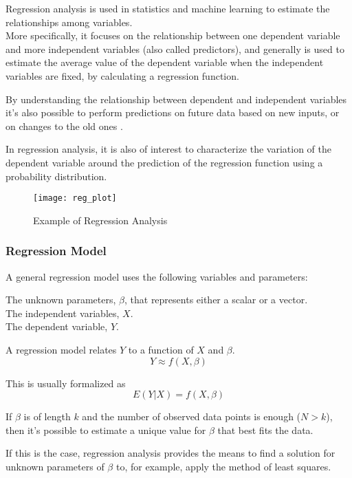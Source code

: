 Regression analysis is used in statistics and machine learning to estimate the relationships among variables. \\
More specifically, it focuses on the relationship between one dependent variable and more independent variables (also called predictors), and generally is used to estimate the average value of the dependent variable when the independent variables are fixed, by calculating a regression function.

By understanding the relationship between dependent and independent variables it's also possible to perform predictions on future data based on new inputs, or on changes to the old ones \cite{wiki:reg_an}.

In regression analysis, it is also of interest to characterize the variation of the dependent variable around the prediction of the regression function using a probability distribution.

\begin{figure}[H]
	\centering
	\texttt{[image: reg\_plot]}
	\caption{Example of Regression Analysis}
	\label{fig:reg_plot}
\end{figure}	

\subsubsection*{Regression Model} 
A general regression model uses the following variables and parameters:

The unknown parameters, $\beta$, that represents either a scalar or a vector.\\
The independent variables, $X$. \\
The dependent variable, $Y$.

A regression model relates $Y$ to a function of $X$ and $\beta$.
\begin{equation}
Y \approx f(X,\beta)
\end{equation}

This is usually formalized as
\begin{equation}
E(Y|X) = f(X,\beta)
\end{equation}

If $\beta$ is of length $k$ and the number of observed data points is enough ($N > k$), then it's possible to estimate a unique value for $\beta$ that best fits the data.

If this is the case, regression analysis provides the means to find a solution for unknown parameters of $\beta$ to, for example, apply the method of least squares.

